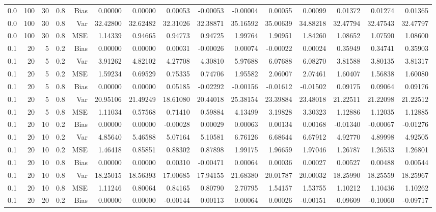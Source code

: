\begin{table}[!htbp]
\begin{tabular}{lrrrrrrrrrrrrrr}
0.0 & 100 & 30 & 0.8 & Bias & 0.00000 & 0.00000 & 0.00053 & -0.00053 & -0.00004 & 0.00055 & 0.00099 & 0.01372 & 0.01274 & 0.01365 \\
0.0 & 100 & 30 & 0.8 & Var & 32.42800 & 32.62482 & 32.31026 & 32.38871 & 35.16592 & 35.00639 & 34.88218 & 32.47794 & 32.47543 & 32.47797 \\
0.0 & 100 & 30 & 0.8 & MSE & 1.14339 & 0.94665 & 0.94773 & 0.94725 & 1.99764 & 1.90951 & 1.84260 & 1.08652 & 1.07590 & 1.08600 \\
0.1 &  20 &  5 & 0.2 & Bias & 0.00000 & 0.00000 & 0.00031 & -0.00026 & 0.00074 & -0.00022 & 0.00024 & 0.35949 & 0.34741 & 0.35903 \\
0.1 &  20 &  5 & 0.2 & Var & 3.91262 & 4.82102 & 4.27708 & 4.30810 & 5.97688 & 6.07688 & 6.08270 & 3.81588 & 3.80135 & 3.81317 \\
0.1 &  20 &  5 & 0.2 & MSE & 1.59234 & 0.69529 & 0.75335 & 0.74706 & 1.95582 & 2.06007 & 2.07461 & 1.60407 & 1.56838 & 1.60080 \\
0.1 &  20 &  5 & 0.8 & Bias & 0.00000 & 0.00000 & 0.05185 & -0.02292 & -0.00156 & -0.01612 & -0.01502 & 0.09175 & 0.09064 & 0.09176 \\
0.1 &  20 &  5 & 0.8 & Var & 20.95106 & 21.49249 & 18.61080 & 20.44018 & 25.38154 & 23.39884 & 23.48018 & 21.22511 & 21.22098 & 21.22512 \\
0.1 &  20 &  5 & 0.8 & MSE & 1.11034 & 0.57568 & 0.71410 & 0.59884 & 4.13499 & 3.19828 & 3.30323 & 1.12886 & 1.12035 & 1.12885 \\
0.1 &  20 & 10 & 0.2 & Bias & 0.00000 & 0.00000 & -0.00028 & 0.00029 & 0.00063 & 0.00134 & 0.00168 & -0.01340 & -0.00067 & -0.01276 \\
0.1 &  20 & 10 & 0.2 & Var & 4.85640 & 5.46588 & 5.07164 & 5.10581 & 6.76126 & 6.68644 & 6.67912 & 4.92770 & 4.89998 & 4.92505 \\
0.1 &  20 & 10 & 0.2 & MSE & 1.46418 & 0.85851 & 0.88302 & 0.87898 & 1.99175 & 1.96659 & 1.97046 & 1.26787 & 1.26533 & 1.26801 \\
0.1 &  20 & 10 & 0.8 & Bias & 0.00000 & 0.00000 & 0.00310 & -0.00471 & 0.00064 & 0.00036 & 0.00027 & 0.00527 & 0.00488 & 0.00544 \\
0.1 &  20 & 10 & 0.8 & Var & 18.25015 & 18.56393 & 17.00685 & 17.94155 & 21.68380 & 20.01787 & 20.00032 & 18.25990 & 18.25559 & 18.25967 \\
0.1 &  20 & 10 & 0.8 & MSE & 1.11246 & 0.80064 & 0.84165 & 0.80790 & 2.70795 & 1.54157 & 1.53755 & 1.10212 & 1.10436 & 1.10262 \\
0.1 &  20 & 20 & 0.2 & Bias & 0.00000 & 0.00000 & -0.00144 & 0.00113 & 0.00064 & 0.00026 & -0.00151 & -0.09609 & -0.10060 & -0.09717 \\

\end{tabular}
\end{table}
